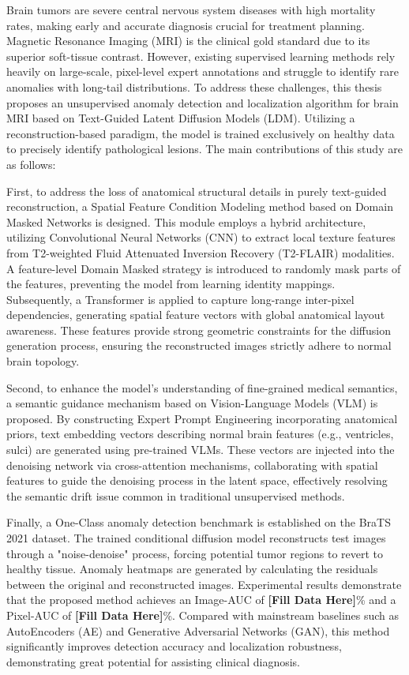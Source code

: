 \documentclass[Win]{xjtuBSThesis}  %
\begin{document}
\begin{abstracten} %

Brain tumors are severe central nervous system diseases with high mortality rates, making early and accurate diagnosis crucial for treatment planning. Magnetic Resonance Imaging (MRI) is the clinical gold standard due to its superior soft-tissue contrast. However, existing supervised learning methods rely heavily on large-scale, pixel-level expert annotations and struggle to identify rare anomalies with long-tail distributions. To address these challenges, this thesis proposes an unsupervised anomaly detection and localization algorithm for brain MRI based on Text-Guided Latent Diffusion Models (LDM). Utilizing a reconstruction-based paradigm, the model is trained exclusively on healthy data to precisely identify pathological lesions. The main contributions of this study are as follows:

First, to address the loss of anatomical structural details in purely text-guided reconstruction, a Spatial Feature Condition Modeling method based on Domain Masked Networks is designed. This module employs a hybrid architecture, utilizing Convolutional Neural Networks (CNN) to extract local texture features from T2-weighted Fluid Attenuated Inversion Recovery (T2-FLAIR) modalities. A feature-level Domain Masked strategy is introduced to randomly mask parts of the features, preventing the model from learning identity mappings. Subsequently, a Transformer is applied to capture long-range inter-pixel dependencies, generating spatial feature vectors with global anatomical layout awareness. These features provide strong geometric constraints for the diffusion generation process, ensuring the reconstructed images strictly adhere to normal brain topology.

Second, to enhance the model's understanding of fine-grained medical semantics, a semantic guidance mechanism based on Vision-Language Models (VLM) is proposed. By constructing Expert Prompt Engineering incorporating anatomical priors, text embedding vectors describing normal brain features (e.g., ventricles, sulci) are generated using pre-trained VLMs. These vectors are injected into the denoising network via cross-attention mechanisms, collaborating with spatial features to guide the denoising process in the latent space, effectively resolving the semantic drift issue common in traditional unsupervised methods.

Finally, a One-Class anomaly detection benchmark is established on the BraTS 2021 dataset. The trained conditional diffusion model reconstructs test images through a "noise-denoise" process, forcing potential tumor regions to revert to healthy tissue. Anomaly heatmaps are generated by calculating the residuals between the original and reconstructed images. Experimental results demonstrate that the proposed method achieves an Image-AUC of \textbf{[Fill Data Here]}\% and a Pixel-AUC of \textbf{[Fill Data Here]}\%. Compared with mainstream baselines such as AutoEncoders (AE) and Generative Adversarial Networks (GAN), this method significantly improves detection accuracy and localization robustness, demonstrating great potential for assisting clinical diagnosis.


\end{abstracten}
\end{document}
